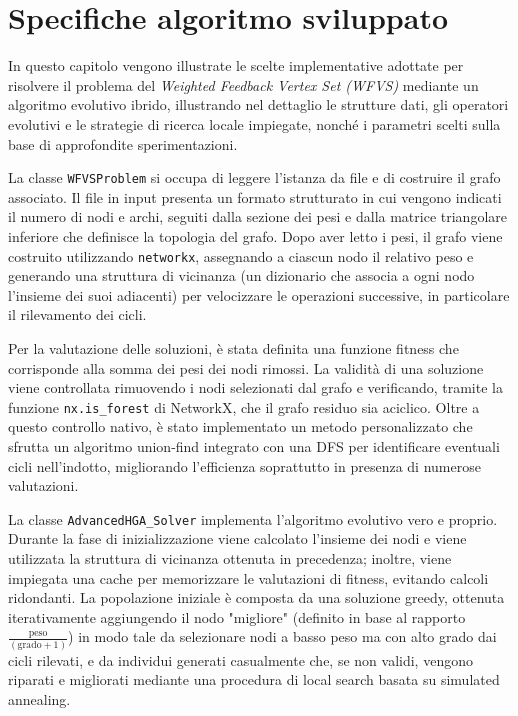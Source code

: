 \documentclass[12pt,a4paper,twoside]{article}
\begin{document}
\section{Specifiche algoritmo sviluppato}
In questo capitolo vengono illustrate le scelte implementative adottate per risolvere il problema del \emph{Weighted Feedback Vertex Set (WFVS)} mediante un algoritmo evolutivo ibrido, illustrando nel dettaglio le strutture dati, gli operatori evolutivi e le strategie di ricerca locale impiegate, nonché i parametri scelti sulla base di approfondite sperimentazioni.

La classe \texttt{WFVSProblem} si occupa di leggere l'istanza da file e di costruire il grafo associato. Il file in input presenta un formato strutturato in cui vengono indicati il numero di nodi e archi, seguiti dalla sezione dei pesi e dalla matrice triangolare inferiore che definisce la topologia del grafo. Dopo aver letto i pesi, il grafo viene costruito utilizzando \texttt{networkx}, assegnando a ciascun nodo il relativo peso e generando una struttura di vicinanza (un dizionario che associa a ogni nodo l'insieme dei suoi adiacenti) per velocizzare le operazioni successive, in particolare il rilevamento dei cicli.

Per la valutazione delle soluzioni, è stata definita una funzione fitness che corrisponde alla somma dei pesi dei nodi rimossi. La validità di una soluzione viene controllata rimuovendo i nodi selezionati dal grafo e verificando, tramite la funzione \texttt{nx.is\_forest} di NetworkX, che il grafo residuo sia aciclico. Oltre a questo controllo nativo, è stato implementato un metodo personalizzato che sfrutta un algoritmo union-find integrato con una DFS per identificare eventuali cicli nell'indotto, migliorando l'efficienza soprattutto in presenza di numerose valutazioni.

La classe \texttt{AdvancedHGA\_Solver} implementa l'algoritmo evolutivo vero e proprio. Durante la fase di inizializzazione viene calcolato l'insieme dei nodi e viene utilizzata la struttura di vicinanza ottenuta in precedenza; inoltre, viene impiegata una cache per memorizzare le valutazioni di fitness, evitando calcoli ridondanti. La popolazione iniziale è composta da una soluzione greedy, ottenuta iterativamente aggiungendo il nodo "migliore" (definito in base al rapporto \(\frac{\text{peso}}{(\text{grado}+1)}\)) in modo tale da selezionare nodi a basso peso ma con alto grado dai cicli rilevati, e da individui generati casualmente che, se non validi, vengono riparati e migliorati mediante una procedura di local search basata su simulated annealing.
\end{document}
